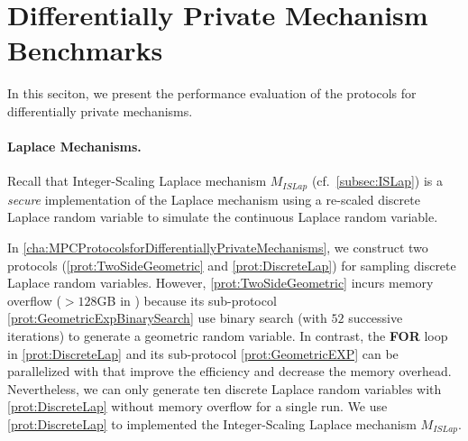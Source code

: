 \section{Differentially Private Mechanism Benchmarks}
\label{sec:DifferentiallyPirvateMechanismBenchmarks}
In this seciton, we present the performance evaluation of the \smpc protocols for differentially private mechanisms.

\paragraph{Laplace Mechanisms.}
Recall that Integer-Scaling Laplace mechanism $M_{ISLap} $ (cf.~\autoref{subsec:ISLap}) is a \textit{secure} implementation of the Laplace mechanism using a re-scaled discrete Laplace random variable to simulate the continuous Laplace random variable.

In \autoref{cha:MPCProtocolsforDifferentiallyPrivateMechanisms}, we construct two \smpc protocols (\autoref{prot:TwoSideGeometric} and \autoref{prot:DiscreteLap}) for sampling discrete Laplace random variables. However, \autoref{prot:TwoSideGeometric} incurs memory overflow ($>128$GB in \twopc) because its sub-protocol \autoref{prot:GeometricExpBinarySearch} use binary search (with $52$ successive iterations) to generate a geometric random variable. In contrast, the \textbf{FOR} loop in \autoref{prot:DiscreteLap} and its sub-protocol \autoref{prot:GeometricEXP} can be parallelized with \simd that improve the efficiency and decrease the memory overhead.
Nevertheless, we can only generate ten discrete Laplace random variables with \autoref{prot:DiscreteLap} without memory overflow for a single run.
We use \autoref{prot:DiscreteLap} to implemented the Integer-Scaling Laplace mechanism $M_{ISLap}$.



